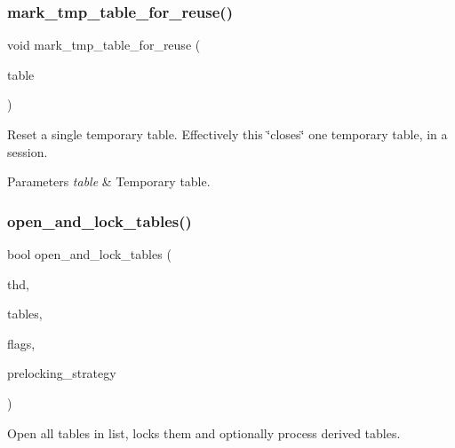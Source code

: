 \subsubsection{\texorpdfstring{mark\+\_\+tmp\+\_\+table\+\_\+for\+\_\+reuse()}{mark\_tmp\_table\_for\_reuse()}}
{\footnotesize\ttfamily void mark\+\_\+tmp\+\_\+table\+\_\+for\+\_\+reuse (\begin{DoxyParamCaption}\item[{\mbox{\hyperlink{structTABLE}{T\+A\+B\+LE}} $\ast$}]{table }\end{DoxyParamCaption})}

Reset a single temporary table. Effectively this \char`\"{}closes\char`\"{} one temporary table, in a session.


\begin{DoxyParams}{Parameters}
{\em table} & Temporary table. \\
\hline
\end{DoxyParams}
\mbox{\label{group__Data__Dictionary_gab469748dd06a6477d4ce23f742af0794}} 
\subsubsection{\texorpdfstring{open\+\_\+and\+\_\+lock\+\_\+tables()}{open\_and\_lock\_tables()}}
{\footnotesize\ttfamily bool open\+\_\+and\+\_\+lock\+\_\+tables (\begin{DoxyParamCaption}\item[{T\+HD $\ast$}]{thd,  }\item[{\mbox{\hyperlink{structTABLE__LIST}{T\+A\+B\+L\+E\+\_\+\+L\+I\+ST}} $\ast$}]{tables,  }\item[{uint}]{flags,  }\item[{\mbox{\hyperlink{classPrelocking__strategy}{Prelocking\+\_\+strategy}} $\ast$}]{prelocking\+\_\+strategy }\end{DoxyParamCaption})}

Open all tables in list, locks them and optionally process derived tables.


